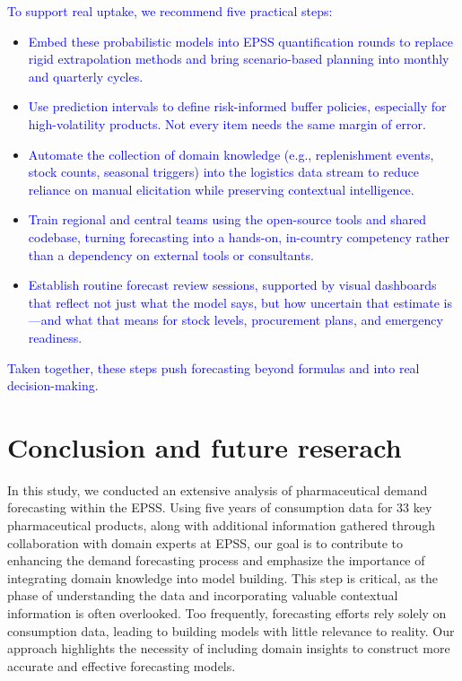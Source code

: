 \documentclass[
  authoryear,
  preprint,
  3p]{elsarticle}
\begin{document}
\textcolor{blue}{To support real uptake, we recommend five practical steps:}

\begin{itemize}
\item
  \textcolor{blue}{Embed these probabilistic models into EPSS quantification rounds to replace rigid extrapolation methods and bring scenario-based planning into monthly and quarterly cycles.}
\item
  \textcolor{blue}{Use prediction intervals to define risk-informed buffer policies, especially for high-volatility products. Not every item needs the same margin of error.}
\item
  \textcolor{blue}{Automate the collection of domain knowledge  (e.g., replenishment events, stock counts, seasonal triggers) into the logistics data stream to reduce reliance on manual elicitation while preserving contextual intelligence.}
\item
  \textcolor{blue}{Train regional and central teams using the open-source tools and shared codebase, turning forecasting into a hands-on, in-country competency rather than a dependency on external tools or consultants.}
\item
  \textcolor{blue}{Establish routine forecast review sessions, supported by visual dashboards that reflect not just what the model says, but how uncertain that estimate is—and what that means for stock levels, procurement plans, and emergency readiness.}
\end{itemize}

\textcolor{blue}{Taken together, these steps push forecasting beyond formulas and into real decision-making.
}

\section{Conclusion and future reserach}\label{sec-conclusion}

In this study, we conducted an extensive analysis of pharmaceutical
demand forecasting within the EPSS. Using five years of consumption data
for 33 key pharmaceutical products, along with additional information
gathered through collaboration with domain experts at EPSS, our goal is
to contribute to enhancing the demand forecasting process and emphasize
the importance of integrating domain knowledge into model building. This
step is critical, as the phase of understanding the data and
incorporating valuable contextual information is often overlooked. Too
frequently, forecasting efforts rely solely on consumption data, leading
to building models with little relevance to reality. Our approach
highlights the necessity of including domain insights to construct more
accurate and effective forecasting models.
\end{document}
